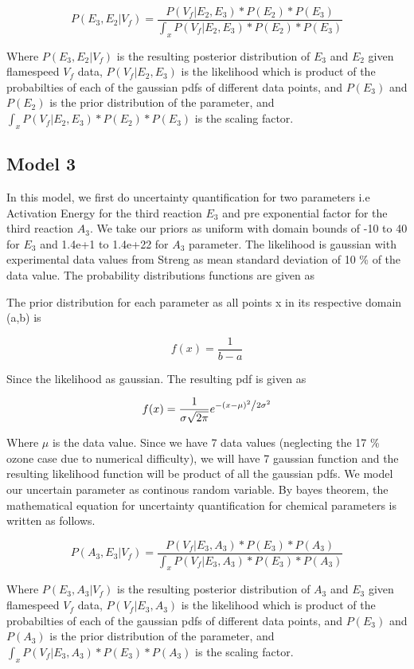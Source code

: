  $$P( E_3, E_2 |V_f ) = \frac{P(V_f| E_2,E_3)* P(E_2)* P(E_3)}{\int_x P(V_f|E_2,E_3)* P(E_2)*P(E_3)}$$ 
 
 \noindent Where  $P(E_3,E_2 |V_f)$ is the resulting posterior distribution of $E_3$ and $E_2$ given flamespeed $V_f$ data, $P(V_f| E_2 ,E_3)$ is the likelihood which is product of the probabilties of each of the gaussian pdfs of different data points, and $ P(E_3)$ and $P(E_2)$ is the prior distribution of the parameter, and $\int_x P(V_f|E_2,E_3)* P(E_2)*P(E_3)$ is the scaling factor.
 

\subsection{Model 3}


\noindent In this model, we first do uncertainty quantification for two parameters i.e Activation Energy for the third reaction $E_3$ and pre exponential factor for the third reaction $A_3$. We take our priors as uniform with domain bounds of -10 to 40 for $E_3$  and 1.4e+1 to 1.4e+22 for $A_3$  parameter. The likelihood is gaussian with experimental data values from Streng\cite{Streng} as mean standard deviation of 10 \% of the data value. The probability distributions functions are given as

\nonident The prior distribution for each parameter as all points x in its respective domain (a,b) is 

$$f(x) = \frac{1}{b -a}$$


\noindent Since the likelihood as gaussian. The resulting pdf is given as 

$$f(x) = \frac{1}{{\sigma \sqrt {2\pi } }}e^{{{ - \left( {x - \mu } \right)^2 } \mathord{\left/ {\vphantom {{ - \left( {x - \mu } \right)^2 } {2\sigma ^2 }}} \right. \kern-\nulldelimiterspace} {2\sigma ^2 }}} $$

  
\noindent Where $\mu$ is the data value. Since we have 7 data values (neglecting the 17 \% ozone case due to numerical difficulty), we will have 7 gaussian function and the resulting likelihood function will be product of all the gaussian pdfs. We model our uncertain parameter as continous random variable. By bayes theorem, the mathematical equation for uncertainty quantification for chemical parameters is written as follows. 

 $$P( A_3, E_3 |V_f ) = \frac{P(V_f| E_3,A_3)* P(E_3)* P(A_3)}{\int_x P(V_f|E_3,A_3)* P(E_3)*P(A_3)}$$ 
 
 \noindent Where  $P(E_3,A_3 |V_f)$ is the resulting posterior distribution of $A_3$ and $E_3$ given flamespeed $V_f$ data, $P(V_f| E_3 ,A_3)$ is the likelihood which is product of the probabilties of each of the gaussian pdfs of different data points, and $ P(E_3)$ and $P(A_3)$ is the prior distribution of the parameter, and $\int_x P(V_f|E_3,A_3)*P(E_3)*P(A_3)$ is the scaling factor.


